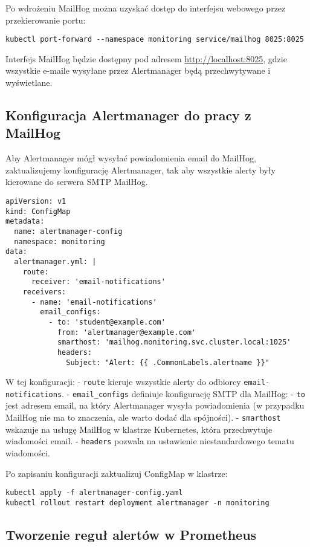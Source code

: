\documentclass{article}
\begin{document}
Po wdrożeniu MailHog można uzyskać dostęp do interfejsu webowego przez przekierowanie portu:

\begin{lstlisting}
kubectl port-forward --namespace monitoring service/mailhog 8025:8025
\end{lstlisting}

Interfejs MailHog będzie dostępny pod adresem \url{http://localhost:8025}, gdzie wszystkie e-maile wysyłane przez Alertmanager będą przechwytywane i wyświetlane.

\subsection{Konfiguracja Alertmanager do pracy z MailHog}

Aby Alertmanager mógł wysyłać powiadomienia email do MailHog, zaktualizujemy konfigurację Alertmanager, tak aby wszystkie alerty były kierowane do serwera SMTP MailHog.

\begin{lstlisting}
apiVersion: v1
kind: ConfigMap
metadata:
  name: alertmanager-config
  namespace: monitoring
data:
  alertmanager.yml: |
    route:
      receiver: 'email-notifications'
    receivers:
      - name: 'email-notifications'
        email_configs:
          - to: 'student@example.com'
            from: 'alertmanager@example.com'
            smarthost: 'mailhog.monitoring.svc.cluster.local:1025'
            headers:
              Subject: "Alert: {{ .CommonLabels.alertname }}"
\end{lstlisting}

W tej konfiguracji:
- \texttt{route} kieruje wszystkie alerty do odbiorcy \texttt{email-notifications}.
- \texttt{email\_configs} definiuje konfigurację SMTP dla MailHog:
  - \texttt{to} jest adresem email, na który Alertmanager wysyła powiadomienia (w przypadku MailHog nie ma to znaczenia, ale warto dodać dla spójności).
  - \texttt{smarthost} wskazuje na usługę MailHog w klastrze Kubernetes, która przechwytuje wiadomości email.
  - \texttt{headers} pozwala na ustawienie niestandardowego tematu wiadomości.

Po zapisaniu konfiguracji zaktualizuj ConfigMap w klastrze:

\begin{lstlisting}
kubectl apply -f alertmanager-config.yaml
kubectl rollout restart deployment alertmanager -n monitoring
\end{lstlisting}

\subsection{Tworzenie reguł alertów w Prometheus}
\end{document}
